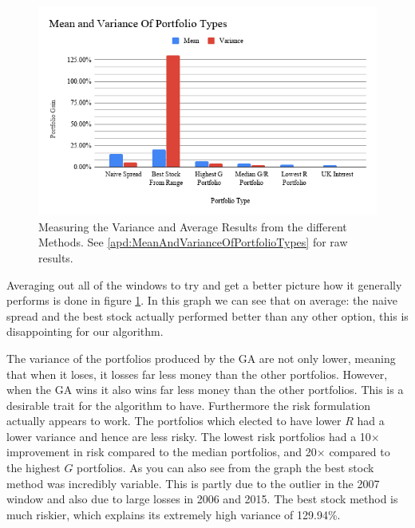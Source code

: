 \documentclass[11pt]{article}
\begin{document}
    \begin{figure}[H] %
        \includegraphics[width=\textwidth]{MeanAndVarianceOfPortfolioTypes}
        \caption{Measuring the Variance and Average Results from the different Methods. See \ref{apd:MeanAndVarianceOfPortfolioTypes} for raw results.}\label{fig:MeanAndVarianceOfPortfolioTypes}
    \end{figure}

    Averaging out all of the windows to try and get a better picture how it generally
    performs is done in figure \ref{fig:MeanAndVarianceOfPortfolioTypes}. In this graph
    we can see that on average: the naive spread and the best stock actually performed
    better than any other option, this is disappointing for our algorithm.

    The variance of the portfolios produced by the GA are not only lower, meaning that
    when it loses, it losses far less money than the other portfolios. However, when the GA wins
    it also wins far less money than the other portfolios. This is a
    desirable trait for the algorithm to have. Furthermore the risk formulation
    actually appears to work. The portfolios which elected to have lower \(R\)
    had a lower variance and hence are less risky. The lowest risk portfolios
    had a 10\(\times\) improvement in risk compared to the median portfolios, and 20\(\times\)
    compared to the highest \(G\) portfolios. As you can also see from the graph the best
    stock method was incredibly variable. This is partly due to the outlier in the 2007
    window and also due to large losses in 2006 and 2015. The best stock method
    is much riskier, which explains its extremely high variance of 129.94\%.
\end{document}
